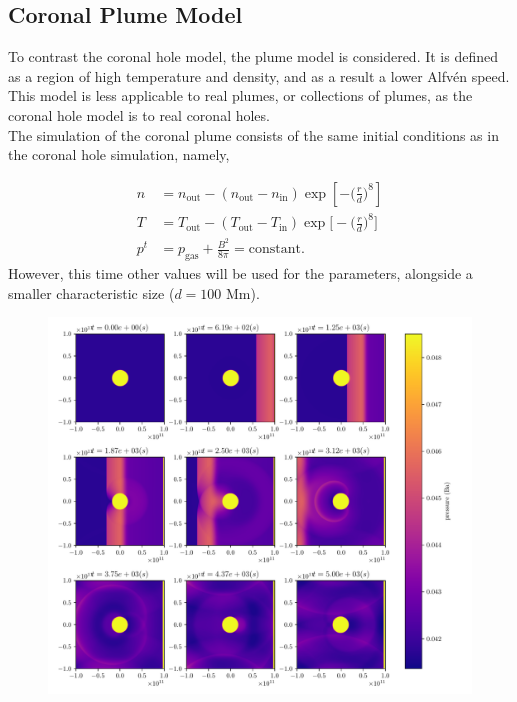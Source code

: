 \documentclass[a4paper]{article}
\let\oldcap\caption
\renewcommand{\caption}[1]{\parbox{.9\linewidth}{\oldcap{#1}}}
\begin{document}
\subsection{Coronal Plume Model} 
To contrast the coronal hole model, the plume model is considered. 
It is defined as a region of high temperature and density, and as a result a lower Alfv\'en speed.
This model is less applicable to real plumes, or collections of plumes, as the coronal hole model is to real coronal holes.\\

The simulation of the coronal plume consists of the same initial conditions as in the coronal hole simulation, namely,

\begin{align*}
    n &= n_{\text{out}} - (n_{\text{out}}-n_{\text{in}})\exp\left[-\bigg(\frac{r}{d}\bigg)^8\right]\\
    T &= T_{\text{out}} - (T_{\text{out}}-T_{\text{in}})\exp\bigg[-\bigg(\frac{r}{d}\bigg)^8\bigg]\\
     p^t &= p_{\text{gas}} + \frac{B^2}{8\pi} = \text{constant}.
\end{align*}
However, this time other values will be used for the parameters, alongside a smaller characteristic size ($d = 100$ Mm).
\begin{figure}[h]
	\centering
	\includegraphics[width=1\textwidth]{figures/plume_time.pdf}
	\caption{}
	\label{fig:figures-plume_time-pdf}
\end{figure}
\end{document}
